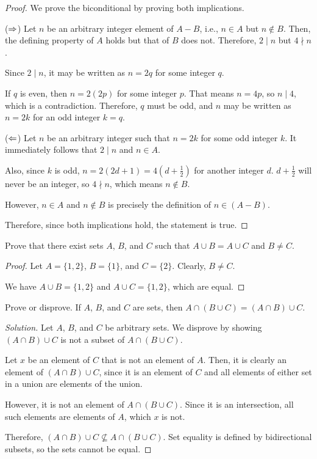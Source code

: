 \begin{proof}
  We prove the biconditional by proving both implications.

  ($\Rightarrow$) Let $n$ be an arbitrary integer element of $A-B$, i.e., $n\in A$ but $n\not\in B$.
  Then, the defining property of $A$ holds but that of $B$ does not.
  Therefore, $2 \mid n$ but $4 \nmid n$.

  Since $2 \mid n$, it may be written as $n=2q$ for some integer $q$.

  If $q$ is even, then $n=2(2p)$ for some integer $p$.
  That means $n=4p$, so $n \mid 4$, which is a contradiction.
  Therefore, $q$ must be odd, and $n$ may be written as $n=2k$ for an odd integer $k=q$.

  ($\Leftarrow$) Let $n$ be an arbitrary integer such that $n=2k$ for some odd integer $k$.
  It immediately follows that $2 \mid n$ and $n \in A$.

  Also, since $k$ is odd, $n=2(2d+1)=4\left(d+\frac12\right)$ for another integer $d$.
  $d+\frac12$ will never be an integer, so $4 \nmid n$, which means $n \not\in B$.

  However, $n \in A$ and $n \not\in B$ is precisely the definition of $n \in (A-B)$.

  Therefore, since both implications hold, the statement is true.
\end{proof}


\question Prove that there exist sets $A$, $B$, and $C$ such that $A \cup B=A \cup C$ and $B \neq C$.

\begin{proof}
  Let $A=\{1,2\}$, $B=\{1\}$, and $C=\{2\}$.
  Clearly, $B \neq C$.

  We have $A \cup B = \{1,2\}$ and $A \cup C = \{1,2\}$, which are equal.
\end{proof}


\question Prove or disprove.
If $A$, $B$, and $C$ are sets, then $A \cap (B \cup C) = (A \cap B) \cup C$.

\begin{proof}[Solution]
  Let $A$, $B$, and $C$ be arbitrary sets.
  We disprove by showing $(A \cap B) \cup C$ is not a subset of $A \cap (B \cup C)$.

  Let $x$ be an element of $C$ that is not an element of $A$.
  Then, it is clearly an element of $(A \cap B) \cup C$, since it is an element of $C$ and all elements of either set in a union are elements of the union.

  However, it is not an element of $A \cap (B \cup C)$.
  Since it is an intersection, all such elements are elements of $A$, which $x$ is not.

  Therefore, $(A \cap B) \cup C \not\subseteq A \cap (B \cup C)$.
  Set equality is defined by bidirectional subsets, so the sets cannot be equal.
\end{proof}


